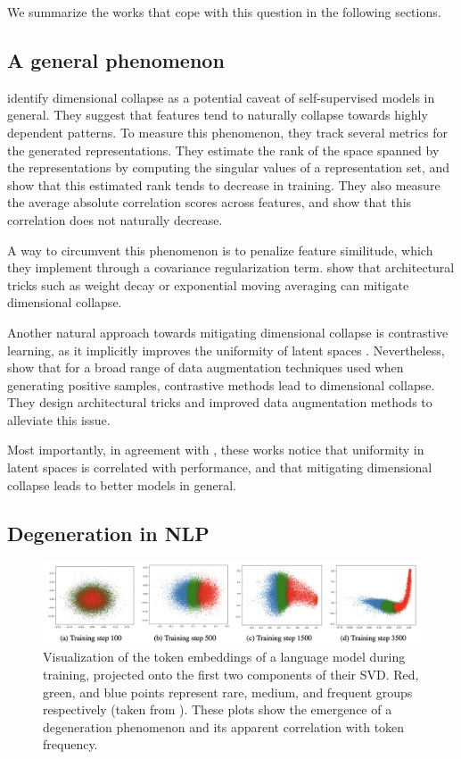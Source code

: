 We summarize the works that cope with this question in the following sections.

\subsection{A general phenomenon}

\citet{9709917} identify dimensional collapse as a potential caveat of self-supervised models in general. They suggest that features tend to naturally collapse towards highly dependent patterns. To measure this phenomenon, they track several metrics for the generated representations. They estimate the rank of the space spanned by the representations by computing the singular values of a representation set, and show that this estimated rank tends to decrease in training. They also measure the average absolute correlation scores across features, and show that this correlation does not naturally decrease. 

A way to circumvent this phenomenon is to penalize feature similitude, which they implement through a covariance regularization term. \citet{pmlr-v139-tian21a} show that architectural tricks such as weight decay \citep{weight_decay} or exponential moving averaging \citep{morales-brotons2024exponential} can mitigate dimensional collapse.

Another natural approach towards mitigating dimensional collapse is contrastive learning, as it implicitly improves the uniformity of latent spaces \citep{pmlr-v119-wang20k}. Nevertheless, \citet{jing2022understanding} show that for a broad range of data augmentation techniques used when generating positive samples, contrastive methods lead to dimensional collapse. They design architectural tricks and improved data augmentation methods to alleviate this issue.

Most importantly, in agreement with \citet{pmlr-v119-wang20k}, these works notice that uniformity in latent spaces is correlated with performance, and that mitigating dimensional collapse leads to better models in general.

\subsection{Degeneration in NLP}
\label{ssec:degeneration}

\begin{figure}[ht]
    \centering
    \includegraphics[width=0.9\linewidth]{sources/related_works/imgs/freq_degen.png}
    \caption{Visualization of the token embeddings of a language model during training, projected onto the first two components of their SVD. Red, green, and blue points represent rare, medium, and frequent groups respectively (taken from \citet{yu-etal-2022-rare}). These plots show the emergence of a degeneration phenomenon and its apparent correlation with token frequency.}
    \label{fig:repr_vs_freq}
\end{figure}

